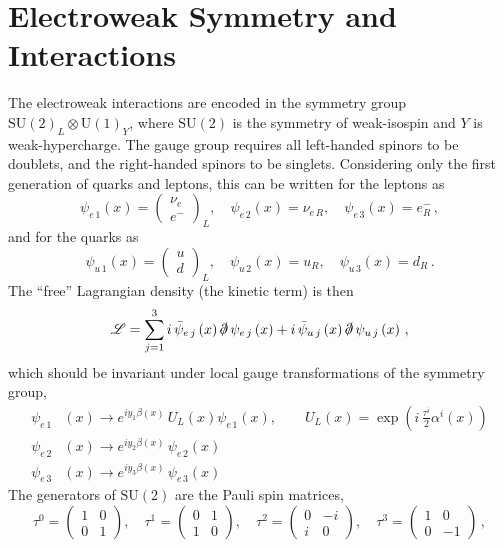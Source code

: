 \section{Electroweak Symmetry and Interactions}\label{section:EW_interactions}

The electroweak interactions are encoded in the symmetry group $\mathrm{SU}(2)_{L} \otimes \mathrm{U}(1)_{Y}$, where $\mathrm{SU}(2)$ is the symmetry of weak-isospin and $Y$ is weak-hypercharge.
The gauge group requires all left-handed spinors to be doublets, and the right-handed spinors to be singlets.
Considering only the first generation of quarks and leptons, this can be written for the leptons as
\[
 \psi_{e\,1}\left(x\right) = \begin{pmatrix}
  \nu_{e} \\
  e^{-}
 \end{pmatrix}_{L},\quad
 \psi_{e\,2}\left(x\right) = \nu_{e\,R},\quad
 \psi_{e\,3}\left(x\right) = e_{R}^{-}\,,
\]
and for the quarks as
\[
 \psi_{u\,1}\left(x\right) = \begin{pmatrix}
  u \\
  d
 \end{pmatrix}_{L},\quad
 \psi_{u\,2}\left(x\right) = u_{R},\quad
 \psi_{u\,3}\left(x\right) = d_{R}\,.
\]
The ``free'' Lagrangian density (the kinetic term) is then
\[
 \mathscr{L} = \sum_{j=1}^{3} i \,\bar{\psi}_{e\,j}\left(x\right) \slashed{\partial} \,\psi_{e\,j}\left(x\right) + i \,\bar{\psi}_{u\,j}\left(x\right) \slashed{\partial} \,\psi_{u\,j}\left(x\right)\,,
\]
which should be invariant under local gauge transformations of the symmetry group,
\[
 \begin{split}
  \psi_{e\,1}&\left(x\right) \to e^{iy_{1} \beta(x)}\, U_{L}\left(x\right)\psi_{e\,1}\left(x\right), \qquad U_{L}\left(x\right) = \exp\left(i\,\frac{\tau^{i}}{2} \alpha^{i}(x)\right)\\
  \psi_{e\,2}&\left(x\right) \to e^{iy_{2} \beta(x)}\, \psi_{e\,2}\left(x\right)\\
  \psi_{e\,3}&\left(x\right) \to e^{iy_{3} \beta(x)}\, \psi_{e\,3}\left(x\right)
 \end{split}
\]
The generators of $\mathrm{SU}(2)$ are the Pauli spin matrices,
\[
 \tau^{0} = \begin{pmatrix}%
  1 & 0 \\%
  0 & 1
 \end{pmatrix},\quad
 \tau^{1} = \begin{pmatrix}%
  0 & 1 \\%
  1 & 0
 \end{pmatrix},\quad
 \tau^{2} = \begin{pmatrix}%
  0 & -i \\%
  i & 0
 \end{pmatrix},\quad
 \tau^{3} = \begin{pmatrix}%
  1 & 0  \\%
  0 & -1 %
 \end{pmatrix}\,,%
\]
